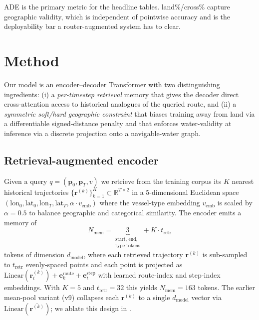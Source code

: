 \documentclass[11pt]{article}
\begin{document}
ADE is the primary metric for the headline tables. land\%/cross\%
capture geographic validity, which is independent of pointwise accuracy
and is the deployability bar a router-augmented system has to clear.

\section{Method}
\label{sec:method}

Our model is an encoder--decoder Transformer with two distinguishing
ingredients: (i) a \emph{per-timestep retrieval} memory that gives the
decoder direct cross-attention access to historical analogues of the
queried route, and (ii) a \emph{symmetric soft/hard geographic constraint}
that biases training away from land via a differentiable signed-distance
penalty and that enforces water-validity at inference via a discrete
projection onto a navigable-water graph.

\subsection{Retrieval-augmented encoder}
\label{sec:method:encoder}

Given a query $q = (\mathbf{p}_0, \mathbf{p}_T, v)$ we retrieve from the
training corpus its $K$ nearest historical trajectories
$\{\mathbf{r}^{(k)}\}_{k=1}^K \subset \mathbb{R}^{T \times 2}$ in a
$5$-dimensional Euclidean space $(\text{lon}_0, \text{lat}_0,
\text{lon}_T, \text{lat}_T, \alpha \cdot v_{\text{emb}})$ where the
vessel-type embedding $v_{\text{emb}}$ is scaled by $\alpha = 0.5$ to
balance geographic and categorical similarity.
The encoder emits a memory of
\begin{equation}
N_{\text{mem}} = \underbrace{3}_{\substack{\text{start, end,}\\ \text{type tokens}}}
              + K \cdot t_{\text{retr}}
\label{eq:enc_memory}
\end{equation}
tokens of dimension $d_{\text{model}}$, where each retrieved trajectory
$\mathbf{r}^{(k)}$ is sub-sampled to $t_{\text{retr}}$ evenly-spaced points
and each point is projected as
$\mathrm{Linear}(\mathbf{r}^{(k)}_t) + \mathbf{e}^{\text{route}}_k +
\mathbf{e}^{\text{step}}_t$ with learned route-index and step-index
embeddings. With $K=5$ and $t_{\text{retr}}=32$ this yields
$N_{\text{mem}}=163$ tokens. The earlier mean-pool variant (v9) collapses
each $\mathbf{r}^{(k)}$ to a single $d_{\text{model}}$ vector via
$\mathrm{Linear}(\overline{\mathbf{r}^{(k)}})$; we ablate this design in
.
\end{document}

